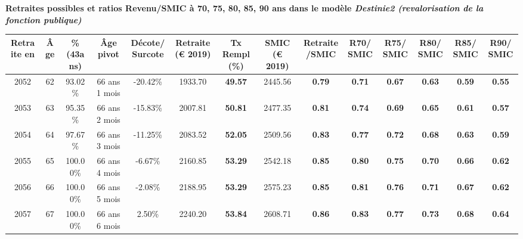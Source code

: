  \vspace{0.1cm} 
{\bf \noindent Retraites possibles et ratios Revenu/SMIC à 70, 75, 80, 85, 90 ans dans le modèle \emph{Destinie2 (revalorisation de la fonction publique)}}  
 
\begin{adjustbox}{max width=\textwidth} 
\begin{tabular}[htb]{|c|c||c|c|c||c|c||c|c||c|c|c|c|c|} 
\hline 
 Retraite en &  Âge &  \%(43ans) &  Âge pivot &  Décote/Surcote &  Retraite (\euro{} 2019) &  Tx Rempl(\%) &  SMIC (\euro{} 2019) &  Retraite/SMIC &  R70/SMIC &  R75/SMIC &  R80/SMIC &  R85/SMIC &  R90/SMIC \\ 
\hline \hline 
 2052 &  62 &  93.02\% &  66 ans 1 mois &  -20.42\% &  1933.70 &  {\bf 49.57} &  2445.56 &  {\bf {\color{red} 0.79}} &  {\bf {\color{red} 0.71}} &  {\bf {\color{red} 0.67}} &  {\bf {\color{red} 0.63}} &  {\bf {\color{red} 0.59}} &  {\bf {\color{red} 0.55}} \\ 
\hline 
 2053 &  63 &  95.35\% &  66 ans 2 mois &  -15.83\% &  2007.81 &  {\bf 50.81} &  2477.35 &  {\bf {\color{red} 0.81}} &  {\bf {\color{red} 0.74}} &  {\bf {\color{red} 0.69}} &  {\bf {\color{red} 0.65}} &  {\bf {\color{red} 0.61}} &  {\bf {\color{red} 0.57}} \\ 
\hline 
 2054 &  64 &  97.67\% &  66 ans 3 mois &  -11.25\% &  2083.52 &  {\bf 52.05} &  2509.56 &  {\bf {\color{red} 0.83}} &  {\bf {\color{red} 0.77}} &  {\bf {\color{red} 0.72}} &  {\bf {\color{red} 0.68}} &  {\bf {\color{red} 0.63}} &  {\bf {\color{red} 0.59}} \\ 
\hline 
 2055 &  65 &  100.00\% &  66 ans 4 mois &  -6.67\% &  2160.85 &  {\bf 53.29} &  2542.18 &  {\bf {\color{red} 0.85}} &  {\bf {\color{red} 0.80}} &  {\bf {\color{red} 0.75}} &  {\bf {\color{red} 0.70}} &  {\bf {\color{red} 0.66}} &  {\bf {\color{red} 0.62}} \\ 
\hline 
 2056 &  66 &  100.00\% &  66 ans 5 mois &  -2.08\% &  2188.95 &  {\bf 53.29} &  2575.23 &  {\bf {\color{red} 0.85}} &  {\bf {\color{red} 0.81}} &  {\bf {\color{red} 0.76}} &  {\bf {\color{red} 0.71}} &  {\bf {\color{red} 0.67}} &  {\bf {\color{red} 0.62}} \\ 
\hline 
 2057 &  67 &  100.00\% &  66 ans 6 mois &  2.50\% &  2240.20 &  {\bf 53.84} &  2608.71 &  {\bf {\color{red} 0.86}} &  {\bf {\color{red} 0.83}} &  {\bf {\color{red} 0.77}} &  {\bf {\color{red} 0.73}} &  {\bf {\color{red} 0.68}} &  {\bf {\color{red} 0.64}} \\ 
\hline 
\hline 
\end{tabular} 
\end{adjustbox} 
 
